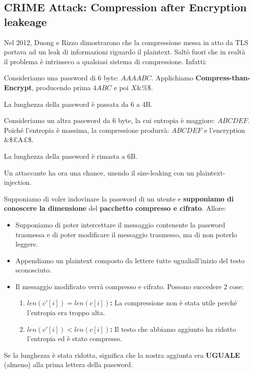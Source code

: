\subsection{CRIME Attack: Compression after Encryption leakeage}
Nel 2012, Duong e Rizzo dimostrarono che la compressione messa in atto da TLS portava ad un leak di informazioni riguardo il plaintext. Saltò fuori che in realtà il problema è intrinseco a qualsiasi sistema di compressione. Infatti:
\begin{example}
Consideriamo una password di 6 byte: $AAAABC$. Applichiamo \textbf{Compress-than-Encrypt}, producendo prima $4ABC$ e poi $X\&\%\$$.\\
\begin{remark}
La lunghezza della password è passata da 6 a 4B.
\end{remark}
Consideriamo un altra password da 6 byte, la cui entropia è maggiore: $ABCDEF$. Poiché l'entropia è massima, la compressione produrrà: $ABCDEF$ e l'encryption $\&\$\text{£A£}\$$.\\
\begin{remark}
La lunghezza della password è rimasta a 6B.
\end{remark}
\end{example}
Un attaccante ha ora una chance, unendo il size-leaking con un plaintext-injection. 
\begin{definition}\label{def:compcpa}
Supponiamo di voler indovinare la password di un utente e \textbf{supponiamo di conoscere la dimensione} del \textbf{pacchetto compresso e cifrato}. Allore:
\begin{itemize}
    \item Supponiamo di poter intercettare il messaggio contenente la password trasmessa e di poter modificare il messaggio trasmesso, ma di non poterlo leggere.
    \item Appendiamo un plaintext composto da lettere tutte uguali\footnotemark all'inizio del testo sconosciuto.
    \item Il messaggio modificato verrà compresso e cifrato. Possono succedere 2 cose:
    \begin{enumerate}
        \item \textbf{$len(c'[i])=len(c[i])$:} La compressione non è stata utile perché l'entropia era troppo alta.
        \item \textbf{$len(c'[i])<len(c[i])$:} Il testo che abbiamo aggiunto ha ridotto l'entropia ed è stato compresso.
    \end{enumerate}
\end{itemize}
Se la lunghezza è stata ridotta, significa che la nostra aggiunta era \textbf{UGUALE} (almeno) alla prima lettera della password. 
\end{definition}
